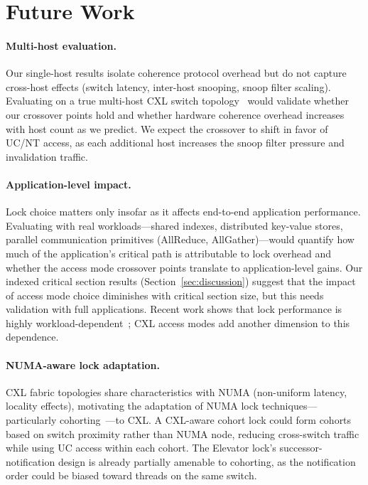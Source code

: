 \section{Future Work}

\paragraph{Multi-host evaluation.}
Our single-host results isolate coherence protocol overhead but do not capture cross-host effects (switch latency, inter-host snooping, snoop filter scaling).
Evaluating on a true multi-host CXL switch topology~\cite{yangUnlockingPotentialCXL2025} would validate whether our crossover points hold and whether hardware coherence overhead increases with host count as we predict.
We expect the crossover to shift in favor of UC/NT access, as each additional host increases the snoop filter pressure and invalidation traffic.

\paragraph{Application-level impact.}
Lock choice matters only insofar as it affects end-to-end application performance.
Evaluating with real workloads---shared indexes, distributed key-value stores, parallel communication primitives (AllReduce, AllGather)---would quantify how much of the application's critical path is attributable to lock overhead and whether the access mode crossover points translate to application-level gains.
Our indexed critical section results (Section~\ref{sec:discussion}) suggest that the impact of access mode choice diminishes with critical section size, but this needs validation with full applications.
Recent work shows that lock performance is highly workload-dependent~\cite{guirouxMulticoreLocksCase}; CXL access modes add another dimension to this dependence.

\paragraph{NUMA-aware lock adaptation.}
CXL fabric topologies share characteristics with NUMA (non-uniform latency, locality effects), motivating the adaptation of NUMA lock techniques---particularly cohorting~\cite{diceLockCohortingGeneral}---to CXL.
A CXL-aware cohort lock could form cohorts based on switch proximity rather than NUMA node, reducing cross-switch traffic while using UC access within each cohort.
The Elevator lock's successor-notification design is already partially amenable to cohorting, as the notification order could be biased toward threads on the same switch.

